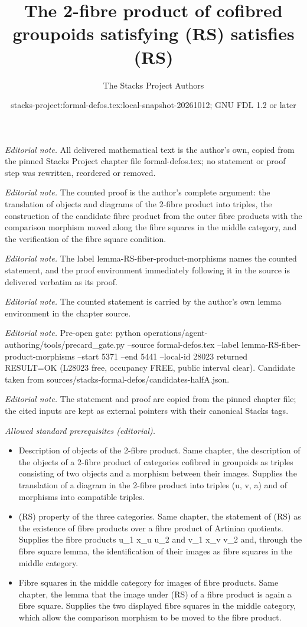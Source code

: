 \documentclass[10pt,a4paper]{amsart}
\title{The 2-fibre product of cofibred groupoids satisfying (RS) satisfies (RS)}
\author{The Stacks Project Authors}
\date{stacks-project:formal-defos.tex:local-snapshot-20261012; GNU FDL 1.2 or later}
\theoremstyle{plain}
\theoremstyle{definition}
\theoremstyle{remark}
\numberwithin{equation}{subsection}
\begin{document}
\maketitle
\noindent\textit{Editorial note.} All delivered mathematical text is the author's own, copied from the pinned Stacks Project chapter file formal-defos.tex; no statement or proof step was rewritten, reordered or removed.\par\medskip
\noindent\textit{Editorial note.} The counted proof is the author's complete argument: the translation of objects and diagrams of the 2-fibre product into triples, the construction of the candidate fibre product from the outer fibre products with the comparison morphism moved along the fibre squares in the middle category, and the verification of the fibre square condition.\par\medskip
\noindent\textit{Editorial note.} The label lemma-RS-fiber-product-morphisms names the counted statement, and the proof environment immediately following it in the source is delivered verbatim as its proof.\par\medskip
\noindent\textit{Editorial note.} The counted statement is carried by the author's own lemma environment in the chapter source.\par\medskip
\noindent\textit{Editorial note.} Pre-open gate: python operations/agent-authoring/tools/precard\_gate.py --source formal-defos.tex --label lemma-RS-fiber-product-morphisms --start 5371 --end 5441 --local-id 28023 returned RESULT=OK (L28023 free, occupancy FREE, public interval clear). Candidate taken from sources/stacks-formal-defos/candidates-halfA.json.\par\medskip
\noindent\textit{Editorial note.} The statement and proof are copied from the pinned chapter file; the cited inputs are kept as external pointers with their canonical Stacks tags.\par\medskip
\noindent\textit{Allowed standard prerequisites (editorial).}\begin{itemize}
\item Description of objects of the 2-fibre product. Same chapter, the description of the objects of a 2-fibre product of categories cofibred in groupoids as triples consisting of two objects and a morphism between their images. Supplies the translation of a diagram in the 2-fibre product into triples (u, v, a) and of morphisms into compatible triples.
\item (RS) property of the three categories. Same chapter, the statement of (RS) as the existence of fibre products over a fibre product of Artinian quotients. Supplies the fibre products u\_1 x\_u u\_2 and v\_1 x\_v v\_2 and, through the fibre square lemma, the identification of their images as fibre squares in the middle category.
\item Fibre squares in the middle category for images of fibre products. Same chapter, the lemma that the image under (RS) of a fibre product is again a fibre square. Supplies the two displayed fibre squares in the middle category, which allow the comparison morphism to be moved to the fibre product.
\end{itemize}\medskip
\end{document}
